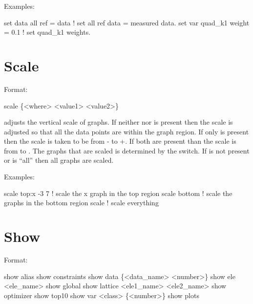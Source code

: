 Examples:
\begin{example}
  set data all ref = data       ! set all ref data = measured data.
  set var quad\_k1 weight = 0.1 ! set quad\_k1 weights. 
\end{example}

\section{Scale}
\label{s:scale}

Format:
\begin{example}
  scale \{<where> <value1> <value2>\}
\end{example}

\vskip 0.2in 
 adjusts the vertical scale of graphs. If neither
 nor  is present then the scale is adjusted
so that all the data points are within the graph region.  If only
 is present then the scale is taken to be from
- to +. If both are present than the scale
is from  to .  The graphs that are scaled is
determined by the  switch. If  is not present
or  is ``all'' then all graphs are scaled.

Examples:
\begin{example}
  scale top:x -3  7  ! scale the x graph in the top region
  scale bottom       ! scale the graphs in the bottom region
  scale              ! scale everything
\end{example}


\section{Show}
\label{s:show}

Format:
\begin{example}
  show alias                     
  show constraints
  show data \{<data_name> <number>\} 
  show ele <ele_name>
  show global
  show lattice <ele1_name> <ele2_name>
  show optimizer
  show top10
  show var <class> \{<number>\}
  show plots
\end{example}

